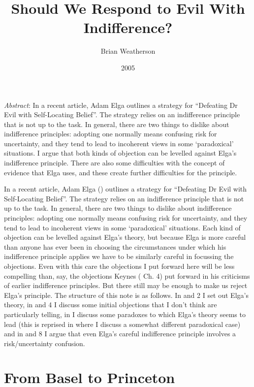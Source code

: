 \documentclass[
  11pt,
  letterpaper,
  DIV=11,
  numbers=noendperiod,
  twoside]{scrartcl}
\title{Should We Respond to Evil With Indifference?}
\author{Brian Weatherson}
\date{2005}
\renewenvironment{abstract}
 {\vspace{-1.25cm}
 \quotation\small\noindent\emph{Abstract}:}
 {\endquotation}
\begin{document}
\maketitle
\begin{abstract}
In a recent article, Adam Elga outlines a strategy for ``Defeating Dr
Evil with Self-Locating Belief''. The strategy relies on an indifference
principle that is not up to the task. In general, there are two things
to dislike about indifference principles: adopting one normally means
confusing risk for uncertainty, and they tend to lead to incoherent
views in some `paradoxical' situations. I argue that both kinds of
objection can be levelled against Elga's indifference principle. There
are also some difficulties with the concept of evidence that Elga uses,
and these create further difficulties for the principle.
\end{abstract}


In a recent article, Adam Elga () outlines
a strategy for ``Defeating Dr Evil with Self-Locating Belief''. The
strategy relies on an indifference principle that is not up to the task.
In general, there are two things to dislike about indifference
principles: adopting one normally means confusing risk for uncertainty,
and they tend to lead to incoherent views in some `paradoxical'
situations. Each kind of objection can be levelled against Elga's
theory, but because Elga is more careful than anyone has ever been in
choosing the circumstances under which his indifference principle
applies we have to be similarly careful in focussing the objections.
Even with this care the objections I put forward here will be less
compelling than, say, the objections Keynes
( Ch. 4) put forward in his criticisms of
earlier indifference principles. But there still may be enough to make
us reject Elga's principle. The structure of this note is as follows. In
and 2 I set out Elga's theory, in and 4 I discuss some initial
objections that I don't think are particularly telling, in I discuss
some paradoxes to which Elga's theory seems to lead (this is reprised in
where I discuss a somewhat different paradoxical case) and in and 8 I
argue that even Elga's careful indifference principle involves a
risk/uncertainty confusion.

\section{From Basel to Princeton}\label{sec-basel}
\end{document}
